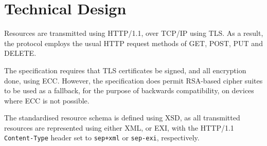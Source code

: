 \section{Technical Design}
 Resources are transmitted using HTTP/1.1, over TCP/IP using TLS.
As a result, the protocol employs the usual HTTP request methods of GET, POST, PUT and DELETE.

The specification requires that TLS certificates be signed, and all encryption done, using ECC. However, the specification does permit RSA-based cipher suites to be used as a fallback, for the purpose of backwards compatibility, on devices where ECC is not possible.

The standardised resource schema is defined using XSD, as all transmitted resources are represented using either XML, or EXI, with the HTTP/1.1 \texttt{Content-Type} header set to \texttt{sep+xml} or \texttt{sep-exi}, respectively.
